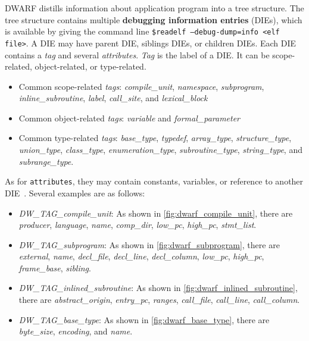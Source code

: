 DWARF distills information about application program into a tree structure. The tree structure contains multiple \textbf{debugging information entries} (DIEs), which is available by giving the command line \texttt{\$readelf --debug-dump=info <elf file>}. A DIE may have parent DIE, siblings DIEs, or children DIEs. Each DIE contains a \textit{tag} and several \textit{attributes}. \textit{Tag} is the label of a DIE. It can be scope-related, object-related, or type-related. 

\begin{itemize}
    \item Common scope-related \textit{tags}: \textit{compile\_unit}, \textit{namespace}, \textit{subprogram}, \textit{inline\_subroutine},  \textit{label}, \textit{call\_site}, and \textit{lexical\_block} 
    
    \item Common object-related \textit{tags}: \textit{variable} and \textit{formal\_parameter}

    \item Common type-related \textit{tags}: \textit{base\_type}, \textit{typedef}, \textit{array\_type}, \textit{structure\_type}, \textit{union\_type}, \textit{class\_type}, \textit{enumeration\_type}, \textit{subroutine\_type}, \textit{string\_type}, and \textit{subrange\_type}.
\end{itemize}

As for \texttt{attributes}, they may contain constants, variables, or reference to another DIE~\cite{dwarf}. Several examples are as follows:

\begin{itemize}
    \item \textit{DW\_TAG\_compile\_unit}: As shown in \cref{fig:dwarf_compile_unit}, there are \textit{producer}, \textit{language}, \textit{name}, \textit{comp\_dir}, \textit{low\_pc}, \textit{high\_pc}, \textit{stmt\_list}.
    
    \item \textit{DW\_TAG\_subprogram}: As shown in \cref{fig:dwarf_subprogram}, there are \textit{external}, \textit{name}, \textit{decl\_file}, \textit{decl\_line}, \textit{decl\_column}, \textit{low\_pc}, \textit{high\_pc}, \textit{frame\_base}, \textit{sibling}.

    \item \textit{DW\_TAG\_inlined\_subroutine}: As shown in \cref{fig:dwarf_inlined_subroutine}, there are \textit{abstract\_origin}, \textit{entry\_pc}, \textit{ranges}, \textit{call\_file}, \textit{call\_line}, \textit{call\_column}.

    \item \textit{DW\_TAG\_base\_type}: As shown in \cref{fig:dwarf_base_type}, there are \textit{byte\_size}, \textit{encoding}, and \textit{name}.
\end{itemize}

